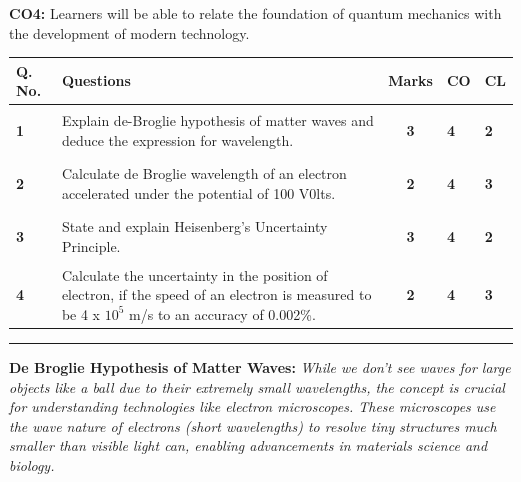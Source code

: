 \documentclass[a4paper,12pt]{article}
\begin{document}
\vspace{0.2cm}
\noindent
\textbf{CO4:} Learners will be able to relate the foundation of quantum mechanics with the development of modern technology. \\
\vspace{0.3cm}

\begin{center}
\begin{tabular}{|p{0.5cm}|p{12cm}|c|p{0.5cm}|p{0.5cm}|}
\hline
\textbf{Q. No.} & \centering \textbf{Questions} & \textbf{Marks} & \textbf{CO} & \textbf{CL} \\
\hline

\begin{center} \textbf{1} \end{center}	& 
\centering Explain de-Broglie hypothesis of matter waves and deduce the expression for wavelength.  
& \textbf{3} & \textbf{4} &  \textbf{2} \\

\hline


\begin{center} \textbf{2} \end{center}	&  
\centering  Calculate de Broglie wavelength of an electron accelerated under the potential of 100 V0lts.  
& \textbf{2} & \textbf{4} & \textbf{3} \\

\hline

\begin{center} \textbf{3} \end{center}	& 
\centering State and explain Heisenberg’s Uncertainty Principle.  
 & \textbf{3} & \textbf{4} &  \textbf{2} \\
\hline

\begin{center} \textbf{4} \end{center}	&  
\centering  Calculate the uncertainty in the position of electron, if the speed of an electron is measured to be 4 x $10^5$ m/s to an accuracy of 0.002\%.
 & \textbf{2} & \textbf{4} & \textbf{3} \\

\hline

\end{tabular}
\end{center}

\hrule
\vspace{0.5cm}
\textbf{De Broglie Hypothesis of Matter Waves:} \textit{While we don't see waves for large objects like a ball due to their extremely small wavelengths, the concept is crucial for understanding technologies like electron microscopes. These microscopes use the wave nature of electrons (short wavelengths) to resolve tiny structures much smaller than visible light can, enabling advancements in materials science and biology.} \\
\end{document}
